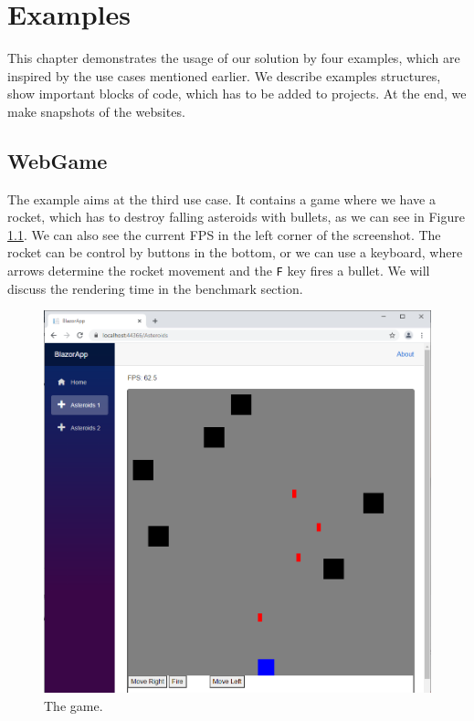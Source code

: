 \chapter{Examples}

This chapter demonstrates the usage of our solution by four examples, which are inspired by the use cases mentioned earlier.
We describe examples structures, show important blocks of code, which has to be added to projects.
At the end, we make snapshots of the websites.
\par

\section{WebGame}

The example aims at the third use case.
It contains a game where we have a rocket, which has to destroy falling asteroids with bullets, as we can see in Figure \ref{img28:game}.
We can also see the current \ac{FPS} in the left corner of the screenshot.
The rocket can be control by buttons in the bottom, or we can use a keyboard, where arrows determine the rocket movement and the \texttt{F} key fires a bullet.
We will discuss the rendering time in the benchmark section.
\par
\begin{figure}\centering
\includegraphics[scale=0.5]{./img/Asteroids}
\caption{The game.}
\label{img28:game}
\end{figure} 
